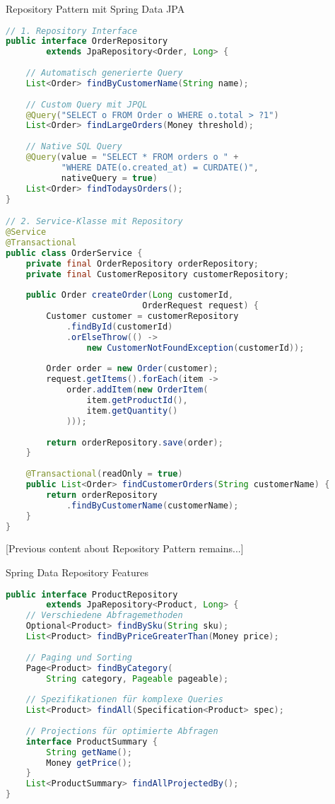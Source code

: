 \begin{KR}{Repository Pattern mit Spring Data JPA}
\begin{lstlisting}[language=Java]
// 1. Repository Interface
public interface OrderRepository 
        extends JpaRepository<Order, Long> {
    
    // Automatisch generierte Query
    List<Order> findByCustomerName(String name);
    
    // Custom Query mit JPQL
    @Query("SELECT o FROM Order o WHERE o.total > ?1")
    List<Order> findLargeOrders(Money threshold);
    
    // Native SQL Query
    @Query(value = "SELECT * FROM orders o " +
           "WHERE DATE(o.created_at) = CURDATE()", 
           nativeQuery = true)
    List<Order> findTodaysOrders();
}

// 2. Service-Klasse mit Repository
@Service
@Transactional
public class OrderService {
    private final OrderRepository orderRepository;
    private final CustomerRepository customerRepository;
    
    public Order createOrder(Long customerId, 
                           OrderRequest request) {
        Customer customer = customerRepository
            .findById(customerId)
            .orElseThrow(() -> 
                new CustomerNotFoundException(customerId));
            
        Order order = new Order(customer);
        request.getItems().forEach(item -> 
            order.addItem(new OrderItem(
                item.getProductId(),
                item.getQuantity()
            )));
            
        return orderRepository.save(order);
    }
    
    @Transactional(readOnly = true)
    public List<Order> findCustomerOrders(String customerName) {
        return orderRepository
            .findByCustomerName(customerName);
    }
}
\end{lstlisting}
\end{KR}

[Previous content about Repository Pattern remains...]

\begin{example}{Spring Data Repository Features}
\begin{lstlisting}[language=Java]
public interface ProductRepository 
        extends JpaRepository<Product, Long> {
    // Verschiedene Abfragemethoden
    Optional<Product> findBySku(String sku);
    List<Product> findByPriceGreaterThan(Money price);
    
    // Paging und Sorting
    Page<Product> findByCategory(
        String category, Pageable pageable);
    
    // Spezifikationen für komplexe Queries
    List<Product> findAll(Specification<Product> spec);
    
    // Projections für optimierte Abfragen
    interface ProductSummary {
        String getName();
        Money getPrice();
    }
    List<ProductSummary> findAllProjectedBy();
}
\end{lstlisting}
\end{example}